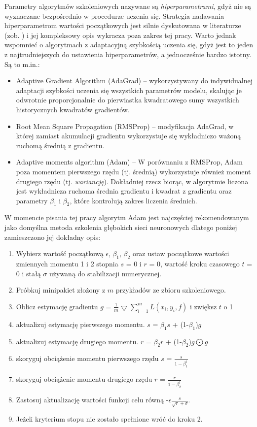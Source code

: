 Parametry algorytmów szkoleniowych nazywane są \textit{hiperparametrami}, gdyż nie są wyznaczane bezpośrednio w procedurze uczenia się. Strategia nadawania hiperparametrom wartości początkowych jest silnie dyskutowana w literaturze (zob. \cite{Koch2017AutomatedHT}) i jej kompleksowy opis wykracza poza zakres tej pracy. Warto jednak wspomnieć o algorytmach z adaptacyjną szybkością uczenia się, gdyż jest to jeden z najtrudniejszych do ustawienia hiperparametrów, a jednocześnie bardzo istotny. Są to m.in.:
\begin{itemize}
 \item Adaptive Gradient Algorithm (AdaGrad) \cite{Duchi:2011:ASM:1953048.2021068} -- wykorzystywany do indywidualnej adaptacji szybkości uczenia się wszystkich parametrów modelu, skalując je odwrotnie proporcjonalnie do pierwiastka kwadratowego sumy wszystkich historycznych kwadratów gradientów.
 \item Root Mean Square Propagation (RMSProp) \cite{SCHMIDHUBER201585} -- modyfikacja AdaGrad, w której zamiast akumulacji gradientu wykorzystuje się wykładniczo ważoną ruchomą średnią z gradientu.
 \item Adaptive moments algorithm (Adam) \cite{DBLP:journals/corr/KingmaB14} -- W porównaniu z RMSProp, Adam poza momentem pierwszego rzędu (tj. średnią) wykorzystuje również moment drugiego rzędu (tj. \textit{wariancję}). Dokładniej rzecz biorąc, w algorytmie liczona jest wykładnicza ruchoma średnia gradientu i kwadrat z gradientu oraz parametry $\beta_1$ i $\beta_2$, które kontrolują zakres liczenia średnich.
\end{itemize}
W momencie pisania tej pracy algorytm Adam jest najczęściej rekomendowanym jako domyślna metoda szkolenia głębokich sieci neuronowych dlatego poniżej zamieszczono jej dokładny opis:
\begin{enumerate}
	\item Wybierz wartość początkową $\epsilon$, $\beta_1$, $\beta_2$ oraz ustaw początkowe wartości zmiennych momentu 1 i 2 stopnia $s$ = 0 i $r$ = 0, wartość kroku czasowego $t$ = 0 i stałą $\sigma$ używaną do stabilizacji numerycznej.
	\item Próbkuj minipakiet złożony z $m$ przykładów ze zbioru szkoleniowego.
	\item Oblicz estymację gradientu $g$ = $\frac{1}{m}\bigtriangledown \sum_{i=1}^{m}L(x_i, y_i, f)$ i zwiększ $t$ o 1
	\item aktualizuj estymację pierwszego momentu. $s$ = $\beta_1$$s$ + (1-$\beta_1$)$g$
	\item aktualizuj estymację drugiego momentu. $r$ = $\beta_2$$r$ + (1-$\beta_2$)$g\bigodot g$
	\item skoryguj obciążenie momentu pierwszego rzędu $s$ = $\frac{s}{1-\beta_1^t}$
	\item skoryguj obciążenie momentu drugiego rzędu $r$ = $\frac{r}{1-\beta_2^t}$
	\item Zastosuj aktualizację wartości funkcji celu równą -$\epsilon$$\frac{s}{\sqrt{r}+\sigma}$.
	\item Jeżeli kryterium stopu nie zostało spełnione wróć do kroku 2. 
\end{enumerate}

